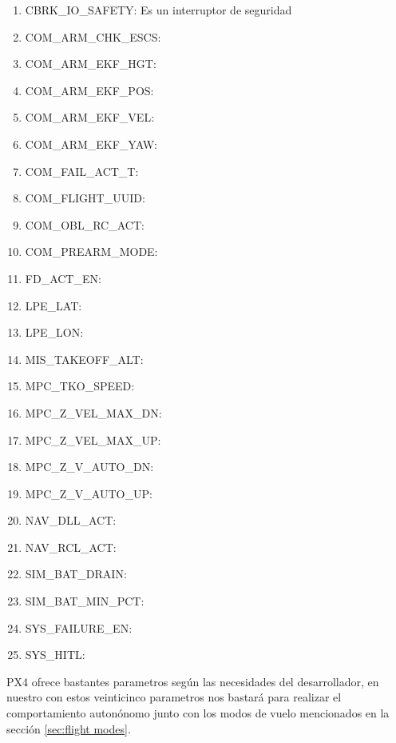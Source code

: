   \begin{enumerate}
    \item CBRK\_IO\_SAFETY: Es un interruptor de seguridad 
    \item COM\_ARM\_CHK\_ESCS: 
    \item COM\_ARM\_EKF\_HGT: 
    \item COM\_ARM\_EKF\_POS:
    \item COM\_ARM\_EKF\_VEL:
    \item COM\_ARM\_EKF\_YAW:
    \item COM\_FAIL\_ACT\_T:
    \item COM\_FLIGHT\_UUID:
    \item COM\_OBL\_RC\_ACT:
    \item COM\_PREARM\_MODE:
    \item FD\_ACT\_EN:
    \item LPE\_LAT:
    \item LPE\_LON:
    \item MIS\_TAKEOFF\_ALT:
    \item MPC\_TKO\_SPEED:
    \item MPC\_Z\_VEL\_MAX\_DN:
    \item MPC\_Z\_VEL\_MAX\_UP:
    \item MPC\_Z\_V\_AUTO\_DN:
    \item MPC\_Z\_V\_AUTO\_UP:
    \item NAV\_DLL\_ACT:
    \item NAV\_RCL\_ACT:
    \item SIM\_BAT\_DRAIN:
    \item SIM\_BAT\_MIN\_PCT:
    \item SYS\_FAILURE\_EN:
    \item SYS\_HITL:
  \end{enumerate}

  PX4 ofrece bastantes parametros según las necesidades del desarrollador, en nuestro con estos veinticinco parametros nos bastará para realizar el comportamiento autonónomo junto con los
  modos de vuelo mencionados en la sección \ref{sec:flight modes}. \newline


